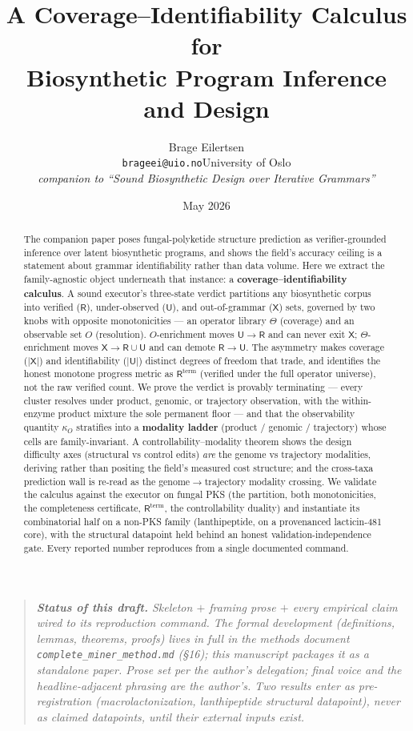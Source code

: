 \documentclass[11pt]{article}
\title{\textbf{A Coverage--Identifiability Calculus for\\Biosynthetic Program Inference and Design}}
\author{Brage Eilertsen\\
\small \texttt{brageei@uio.no}\quad University of Oslo\\
\small \textit{companion to ``Sound Biosynthetic Design over Iterative Grammars''}}
\date{May 2026}
\newcommand{\R}{\mathsf{R}}
\newcommand{\U}{\mathsf{U}}
\newcommand{\X}{\mathsf{X}}
\newcommand{\Rterm}{\mathsf{R}^{\mathrm{term}}}
\newcommand{\kO}{\kappa_{O}}
\begin{document}
\maketitle

\begin{quote}\small\itshape
\textbf{Status of this draft.} Skeleton $+$ framing prose $+$ every empirical claim wired to its
reproduction command. The formal development (definitions, lemmas, theorems, proofs) lives in full in
the methods document \texttt{complete\_miner\_method.md} (\S16); this manuscript packages it as a
standalone paper. Prose set per the author's delegation; final voice and the headline-adjacent phrasing
are the author's. Two results enter as \emph{pre-registration} (macrolactonization, lanthipeptide
structural datapoint), never as claimed datapoints, until their external inputs exist.
\end{quote}

\begin{abstract}
The companion paper poses fungal-polyketide structure prediction as verifier-grounded inference over
latent biosynthetic programs, and shows the field's accuracy ceiling is a statement about grammar
identifiability rather than data volume. Here we extract the family-agnostic object underneath that
instance: a \textbf{coverage--identifiability calculus}. A sound executor's three-state verdict
partitions any biosynthetic corpus into verified ($\R$), under-observed ($\U$), and out-of-grammar
($\X$) sets, governed by two knobs with opposite monotonicities --- an operator library $\Theta$
(coverage) and an observable set $O$ (resolution). $O$-enrichment moves $\U\to\R$ and can never exit
$\X$; $\Theta$-enrichment moves $\X\to\R\cup\U$ and can demote $\R\to\U$. The asymmetry makes coverage
($\lvert\X\rvert$) and identifiability ($\lvert\U\rvert$) distinct degrees of freedom that trade, and
identifies the honest monotone progress metric as $\Rterm$ (verified under the full operator universe),
not the raw verified count. We prove the verdict is provably terminating --- every cluster resolves
under product, genomic, or trajectory observation, with the within-enzyme product mixture the sole
permanent floor --- and that the observability quantity $\kO$ stratifies into a \textbf{modality ladder}
(product / genomic / trajectory) whose cells are family-invariant. A controllability--modality theorem
shows the design difficulty axes (structural vs control edits) \emph{are} the genome vs trajectory
modalities, deriving rather than positing the field's measured cost structure; and the cross-taxa
prediction wall is re-read as the genome$\to$trajectory modality crossing. We validate the calculus
against the executor on fungal PKS (the partition, both monotonicities, the completeness certificate,
$\Rterm$, the controllability duality) and instantiate its combinatorial half on a non-PKS family
(lanthipeptide, on a provenanced lacticin-481 core), with the structural datapoint held behind an honest
validation-independence gate. Every reported number reproduces from a single documented command.
\end{abstract}
\end{document}
